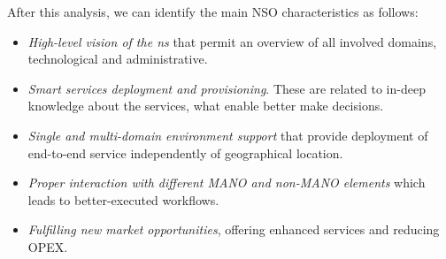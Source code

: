 



After this analysis, we can identify the main NSO characteristics as follows: 
\begin{itemize}
\item \textit{High-level vision of the \gls{ns}} that permit an overview of all involved domains, technological and administrative. 
\item \textit{Smart services deployment and provisioning}. These are related to in-deep knowledge about the services, what enable better make decisions. 
\item \textit{Single and multi-domain environment support} that provide deployment of end-to-end service independently of geographical location.
\item \textit{Proper interaction with different MANO and non-MANO elements} which leads to better-executed workflows.
\item \textit{Fulfilling new market opportunities}, offering enhanced services and reducing OPEX.    
\end{itemize}

